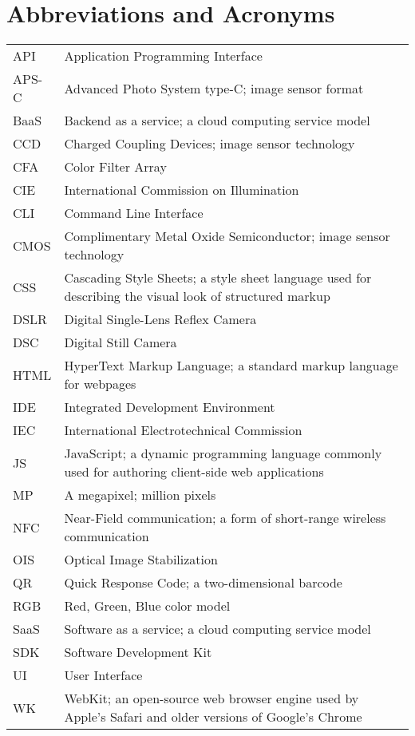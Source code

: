 \documentclass[thesis.tex]{subfiles}
\begin{document}
\chapter*{Abbreviations and Acronyms}

\noindent
\begin{longtable}{@{}p{}p{}@{}}
API & Application Programming Interface \\
APS-C & Advanced Photo System type-C; image sensor format \\
BaaS & Backend as a service; a cloud computing service model \\
CCD & Charged Coupling Devices; image sensor technology \\
CFA & Color Filter Array \\
CIE & International Commission on Illumination \\
CLI & Command Line Interface \\
CMOS & Complimentary Metal Oxide Semiconductor; image sensor technology \\
CSS & Cascading Style Sheets; a style sheet language used for describing the visual look of structured markup \\
DSLR & Digital Single-Lens Reflex Camera \\
DSC & Digital Still Camera \\
HTML & HyperText Markup Language; a standard markup language for webpages \\
IDE & Integrated Development Environment \\
IEC & International Electrotechnical Commission \\
JS & JavaScript; a dynamic programming language commonly used for authoring client-side web applications \\
MP & A megapixel; million pixels \\
NFC & Near-Field communication; a form of short-range wireless communication \\
OIS & Optical Image Stabilization \\
QR & Quick Response Code; a two-dimensional barcode \\
RGB & Red, Green, Blue color model \\
SaaS & Software as a service; a cloud computing service model \\
SDK & Software Development Kit \\
UI & User Interface \\
WK & WebKit; an open-source web browser engine used by Apple's Safari and older versions of Google's Chrome\\

\end{longtable}
\end{document}
